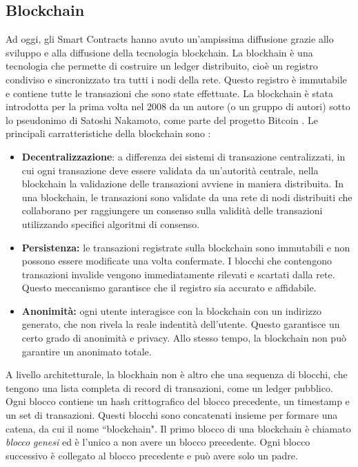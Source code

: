 \documentclass[../../Thesis.tex]{subfiles}
\begin{document}
\subsection{Blockchain}
Ad oggi, gli Smart Contracts hanno avuto un'ampissima diffusione grazie allo sviluppo  e alla diffusione della tecnologia blockchain. La blockhain \`e una tecnologia che permette di costruire un ledger distribuito, cio\`e un registro condiviso e sincronizzato tra tutti i nodi della rete. Questo registro \`e immutabile e contiene tutte le transazioni che sono state effettuate. La blockchain \`e stata introdotta per la prima volta nel 2008 da un autore (o un gruppo di autori) sotto lo pseudonimo di Satoshi Nakamoto, come parte del progetto Bitcoin \cite{Bitcoin}. Le principali carratteristiche della blockchain sono \cite{Blockchain}:
\begin{itemize}
    \item \textbf{Decentralizzazione}: 
    a differenza dei sistemi di transazione centralizzati, in cui ogni transazione deve essere validata da un'autorit\`a centrale, nella blockchain la validazione delle transazioni avviene in maniera distribuita. In una blockchain, le transazioni sono validate da una rete di nodi distribuiti che collaborano per raggiungere un consenso sulla validit\`a delle transazioni utilizzando specifici algoritmi di consenso.
    \item \textbf{Persistenza:} 
    le transazioni registrate sulla blockchain sono immutabili e non possono essere modificate una volta confermate. I blocchi che contengono transazioni invalide vengono immediatamente rilevati e scartati dalla rete. Questo meccanismo garantisce che il registro sia accurato e affidabile.
    \item \textbf{Anonimit\`a:} ogni utente interagisce con la blockchain con un indirizzo generato, che non rivela la reale indentit\`a dell'utente. Questo garantisce un certo grado di anonimit\`a e privacy. Allo stesso tempo, la blockchain non pu\`o garantire un anonimato totale. 
\end{itemize}
A livello architetturale, la blockhain non \`e altro che una sequenza di blocchi, che tengono una lista completa di record di transazioni, come un ledger pubblico. Ogni blocco contiene un hash crittografico del blocco precedente, un timestamp e un set di transazioni. Questi blocchi sono concatenati insieme per formare una catena, da cui il nome ``blockchain". Il primo blocco di una blockchain \`e chiamato \emph{blocco genesi} ed \`e l'unico a non avere un blocco precedente. Ogni blocco successivo \`e collegato al blocco precedente e pu\`o avere solo un padre.\\
\end{document}
